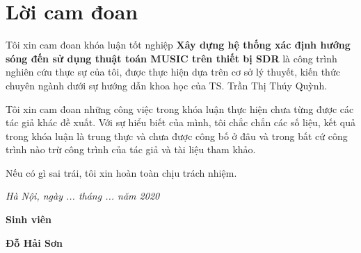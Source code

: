 \clearpage
{}

\chapter*{Lời cam đoan}

Tôi xin cam đoan khóa luận tốt nghiệp \textbf{Xây dựng hệ thống xác định hướng sóng đến sử dụng thuật toán MUSIC trên thiết bị SDR} là công trình nghiên cứu thực sự của tôi, được thực hiện dựa trên cơ sở lý thuyết, kiến thức chuyên ngành dưới sự hướng dẫn khoa học của TS. Trần Thị Thúy Quỳnh.

Tôi xin cam đoan những công việc trong khóa luận thực hiện chưa từng được các tác giả khác đề xuất. Với sự hiểu biết của mình, tôi chắc chắn các số liệu, kết quả trong khóa luận là trung thực và chưa được công bố ở đâu và trong bất cứ công trình nào trừ công trình của tác giả và tài liệu tham khảo.

Nếu có gì sai trái, tôi xin hoàn toàn chịu trách nhiệm.

\vspace{1cm}
\hspace{7cm}\textit{Hà Nội, ngày ... tháng ... năm 2020}

\hspace{9.4cm}\textbf{Sinh viên}
\vspace{2.5cm}


\hspace{9.3cm}\textbf{Đỗ Hải Sơn}

